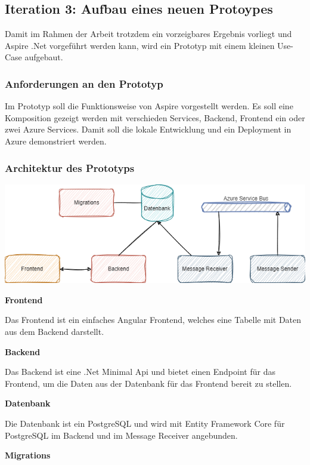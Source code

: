     \subsection{Iteration 3: Aufbau eines neuen Protoypes}
        Damit im Rahmen der Arbeit trotzdem ein vorzeigbares Ergebnis vorliegt und Aspire .Net vorgeführt werden kann, wird ein Prototyp mit einem kleinen Use-Case aufgebaut.
        
        \subsubsection{Anforderungen an den Prototyp}
            Im Prototyp soll die Funktionsweise von Aspire vorgestellt werden. Es soll eine Komposition gezeigt werden mit verschieden Services, Backend, Frontend ein oder zwei Azure Services. Damit soll die lokale Entwicklung und ein Deployment in Azure demonstriert werden.

        \subsubsection{Architektur des Prototyps}
            \includegraphics[scale=0.55]{Ressources/Bilder/Architektur.Prototyp.drawio.png}

            \textbf{Frontend}

            Das Frontend ist ein einfaches Angular Frontend, welches eine Tabelle mit Daten aus dem Backend darstellt.

            \textbf{Backend}

            Das Backend ist eine .Net Minimal Api und bietet einen Endpoint für das Frontend, um die Daten aus der Datenbank für das Frontend bereit zu stellen. 

            \textbf{Datenbank}

            Die Datenbank ist ein PostgreSQL und wird mit Entity Framework Core für PostgreSQL im Backend und im Message Receiver angebunden.

            \textbf{Migrations}

